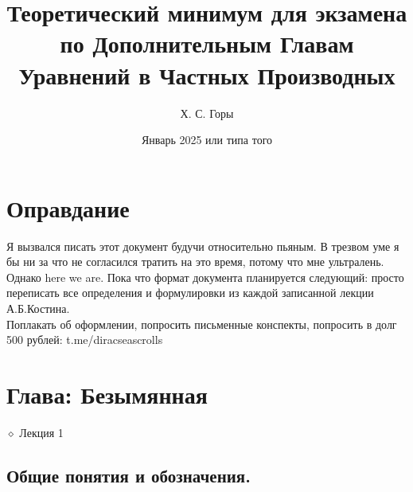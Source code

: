 \documentclass{article}
\title{Теоретический минимум для экзамена по Дополнительным Главам Уравнений в Частных Производных}
\author{Х. С. Горы}
\date{Январь 2025 или типа того}
\begin{document}
\maketitle
\centering
\newtheorem{definition}{Опр.}[subsection]
\newtheorem{theorem}{Теор.}[subsection]

\onehalfspacing

\raggedright
\setcounter{section}{-1}
\section{Оправдание}

Я вызвался писать этот документ будучи относительно пьяным. В трезвом уме я бы ни за что не согласился тратить на это время, потому что мне ультралень. Однако here we are.
Пока что формат документа планируется следующий: просто переписать все определения и формулировки из каждой записанной лекции А.Б.Костина. \\
\vspace{14}
Поплакать об оформлении, попросить письменные конспекты, попросить в долг 500 рублей: t.me/diracseascrolls
\vspace{14}

\section{Глава: Безымянная}

$\diamond$ Лекция 1

\subsection{Общие понятия и обозначения.}\\
\end{document}
